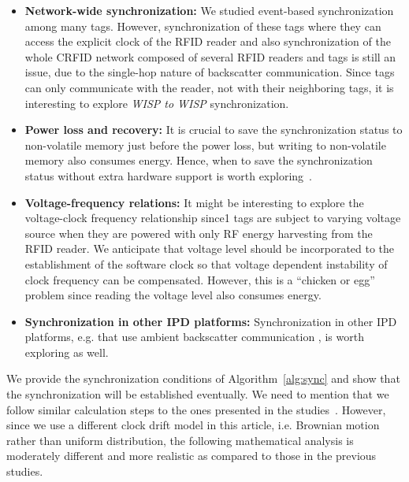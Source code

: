 \documentclass[journal,draftcls,onecolumn,12pt,twoside]{IEEEtranTCOM}
\begin{document}
\begin{itemize}
\item \textbf{Network-wide synchronization:} We studied event-based synchronization among many tags. However, synchronization of these tags where they can access the explicit clock of the RFID reader and also synchronization of the whole CRFID network composed of several RFID readers and tags is still an issue, due to the single-hop nature of backscatter communication. Since tags can only communicate with the reader, not with their neighboring tags, it is interesting to explore \emph{WISP to WISP} synchronization. 
	
\item \textbf{Power loss and recovery:} It is crucial to save the synchronization status to non-volatile memory just before the power loss, but writing to non-volatile memory also consumes energy. Hence, when to save the synchronization status without extra hardware support is worth exploring~\cite{Buettner:2011:Dewdrop,Ransford:2011:Mementos,Lucia:2015:Execution,Colin:2016:Debugger}.

\item \textbf{Voltage-frequency relations:} It might be interesting to explore the voltage-clock frequency relationship since1 tags are subject to varying voltage source when they are powered with only RF energy harvesting from the RFID reader. We anticipate that voltage level should be incorporated to the establishment of the software clock so that voltage dependent instability of clock frequency can be compensated. However, this is a ``chicken or egg'' problem since reading the voltage level also consumes energy. 

\item \textbf{Synchronization in other IPD platforms:} Synchronization in other IPD platforms, e.g. that use ambient backscatter communication \cite{ambient_backscatter}, is worth exploring as well. 
\end{itemize}





\pagebreak
\appendix

We provide the synchronization conditions of Algorithm~\ref{alg:sync} and show that the synchronization will be established eventually. We need to mention that we follow similar calculation steps to the ones presented in the studies~\cite{pi2015,Yildirim:Gradient:2016}. However, since we use a different clock drift model in this article, i.e. Brownian motion rather than uniform distribution, the following  mathematical analysis is moderately different and more realistic as compared to those in the previous studies. 
\end{document}

